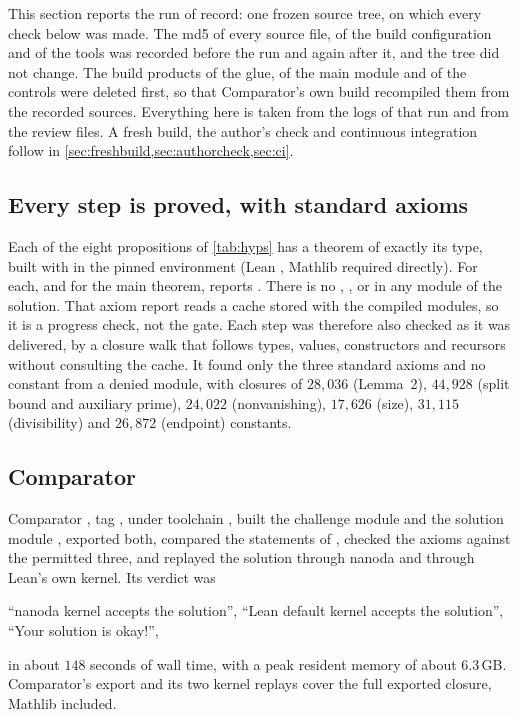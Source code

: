 \documentclass[11pt]{article}
\theoremstyle{definition}
\begin{document}
This section reports the run of record: one frozen source tree, on which every check below was made. The md5 of every source file, of the build configuration and of the tools was recorded before the run and again after it, and the tree did not change. The build products of the glue, of the main module and of the controls were deleted first, so that Comparator's own build recompiled them from the recorded sources. Everything here is taken from the logs of that run and from the review files. A fresh build, the author's check and continuous integration follow in \cref{sec:freshbuild,sec:authorcheck,sec:ci}.

\subsection{Every step is proved, with standard axioms}

Each of the eight propositions of \cref{tab:hyps} has a theorem of exactly its type, built with  in the pinned environment (Lean , Mathlib  required directly). For each, and for the main theorem,  reports . There is no , ,  or  in any module of the solution. That axiom report reads a cache stored with the compiled modules, so it is a progress check, not the gate. Each step was therefore also checked as it was delivered, by a closure walk that follows types, values, constructors and recursors without consulting the cache. It found only the three standard axioms and no constant from a denied module, with closures of $28{,}036$ (Lemma~2), $44{,}928$ (split bound and auxiliary prime), $24{,}022$ (nonvanishing), $17{,}626$ (size), $31{,}115$ (divisibility) and $26{,}872$ (endpoint) constants.

\subsection{Comparator}\label{sec:comparator}

Comparator \cite{Comparator}, tag , under toolchain , built the challenge module  and the solution module , exported both, compared the statements of , checked the axioms against the permitted three, and replayed the solution through nanoda \cite{nanoda} and through Lean's own kernel. Its verdict was
\begin{center}
``nanoda kernel accepts the solution'', \quad ``Lean default kernel accepts the solution'', \quad ``Your solution is okay!'',
\end{center}
in about $148$ seconds of wall time, with a peak resident memory of about $6.3$\,GB. Comparator's export and its two kernel replays cover the full exported closure, Mathlib included.
\end{document}
